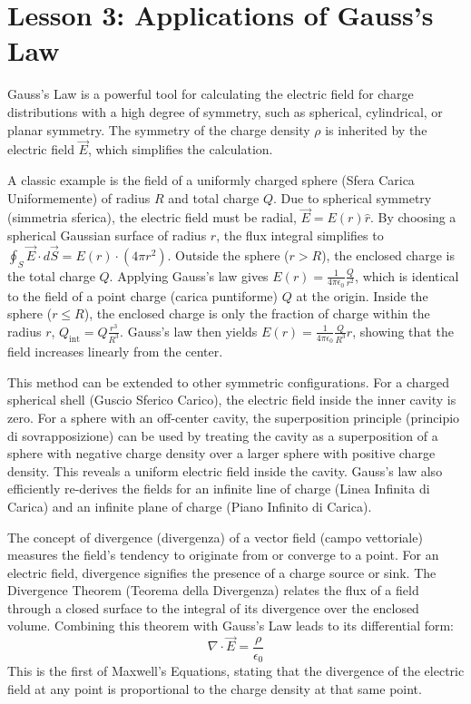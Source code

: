 \section*{Lesson 3: Applications of Gauss's Law}

Gauss's Law is a powerful tool for calculating the electric field for charge distributions with a high degree of symmetry, such as spherical, cylindrical, or planar symmetry. The symmetry of the charge density \(\rho\) is inherited by the electric field \(\vec{E}\), which simplifies the calculation.

A classic example is the field of a uniformly charged sphere (Sfera Carica Uniformemente) of radius \(R\) and total charge \(Q\). Due to spherical symmetry (simmetria sferica), the electric field must be radial, \(\vec{E} = E(r)\hat{r}\). By choosing a spherical Gaussian surface of radius \(r\), the flux integral simplifies to \(\oint_S \vec{E} \cdot d\vec{S} = E(r) \cdot (4\pi r^2)\).
Outside the sphere (\(r > R\)), the enclosed charge is the total charge \(Q\). Applying Gauss's law gives \(E(r) = \frac{1}{4\pi\epsilon_0} \frac{Q}{r^2}\), which is identical to the field of a point charge (carica puntiforme) \(Q\) at the origin.
Inside the sphere (\(r \le R\)), the enclosed charge is only the fraction of charge within the radius \(r\), \(Q_{\text{int}} = Q \frac{r^3}{R^3}\). Gauss's law then yields \(E(r) = \frac{1}{4\pi\epsilon_0} \frac{Q}{R^3} r\), showing that the field increases linearly from the center.

This method can be extended to other symmetric configurations. For a charged spherical shell (Guscio Sferico Carico), the electric field inside the inner cavity is zero. For a sphere with an off-center cavity, the superposition principle (principio di sovrapposizione) can be used by treating the cavity as a superposition of a sphere with negative charge density over a larger sphere with positive charge density. This reveals a uniform electric field inside the cavity. Gauss's law also efficiently re-derives the fields for an infinite line of charge (Linea Infinita di Carica) and an infinite plane of charge (Piano Infinito di Carica).

The concept of divergence (divergenza) of a vector field (campo vettoriale) measures the field's tendency to originate from or converge to a point. For an electric field, divergence signifies the presence of a charge source or sink. The Divergence Theorem (Teorema della Divergenza) relates the flux of a field through a closed surface to the integral of its divergence over the enclosed volume. Combining this theorem with Gauss's Law leads to its differential form:
\begin{equation}
    \nabla \cdot \vec{E} = \frac{\rho}{\epsilon_0}
\end{equation}
This is the first of Maxwell's Equations, stating that the divergence of the electric field at any point is proportional to the charge density at that same point.
